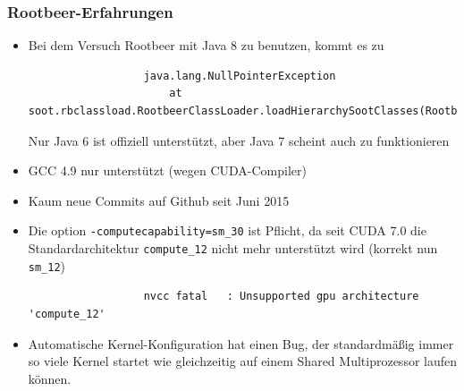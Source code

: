\begin{frame}[fragile]
    \frametitle{Rootbeer-Erfahrungen}

    \begin{itemize}
        \item Bei dem Versuch Rootbeer mit Java 8 zu benutzen, kommt es zu
              \begin{lstlisting}
                  java.lang.NullPointerException
                      at soot.rbclassload.RootbeerClassLoader.loadHierarchySootClasses(RootbeerClassLoader.java:963)
              \end{lstlisting}
              Nur Java 6 ist offiziell unterstützt, aber Java 7 scheint auch zu funktionieren
        \item GCC 4.9 nur unterstützt (wegen CUDA-Compiler)
        \item Kaum neue Commits auf Github seit Juni 2015
        \item Die option \lstinline!-computecapability=sm_30! ist Pflicht, da seit CUDA 7.0 die Standardarchitektur \lstinline!compute_12! nicht mehr unterstützt wird (korrekt nun \lstinline!sm_12!)
              \begin{lstlisting}
                  nvcc fatal   : Unsupported gpu architecture 'compute_12'
              \end{lstlisting}
        \item Automatische Kernel-Konfiguration hat einen Bug, der standardmäßig immer so viele Kernel startet wie gleichzeitig auf einem Shared Multiprozessor laufen können.

\end{itemize}
\end{frame}
